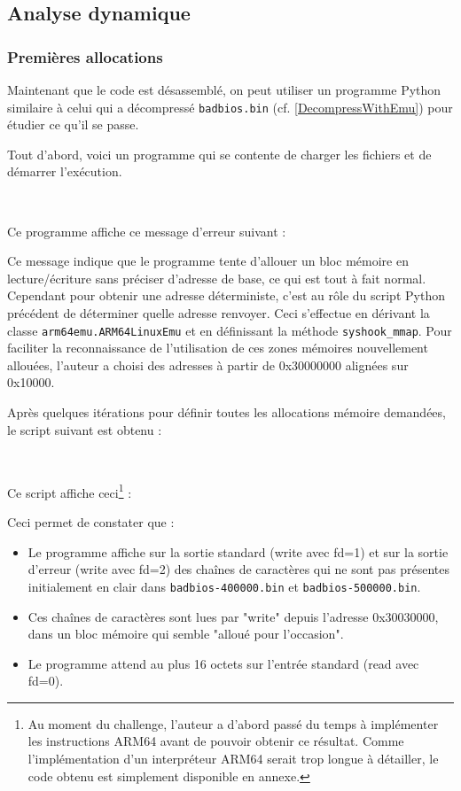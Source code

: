 \documentclass[a4paper,10pt]{article}
\newcommand{\pyinput}[1]{%
    \noindent{\color[rgb]{0.5, 0.5, 0.5}{\rule{\textwidth}{0.4pt}}}
     \\
    \noindent{\color[rgb]{0.5, 0.5, 0.5}{\rule{\textwidth}{0.4pt}}}
}
\begin{document}
\subsection{Analyse dynamique}

\subsubsection{Premières allocations}
\label{arm64mmaps}

Maintenant que le code est désassemblé, on peut utiliser un programme Python similaire à celui qui a décompressé \texttt{badbios.bin} (cf. \ref{DecompressWithEmu}) pour étudier ce qu'il se passe.

Tout d'abord, voici un programme qui se contente de charger les fichiers et de démarrer l'exécution.

\pyinput{2_arm64/run_unpacked_badbios1.py.inc.tex}

Ce programme affiche ce message d'erreur suivant :



Ce message indique que le programme tente d'allouer un bloc mémoire en lecture/écriture sans préciser d'adresse de base, ce qui est tout à fait normal. Cependant pour obtenir une adresse déterministe, c'est au rôle du script Python précédent de déterminer quelle adresse renvoyer. Ceci s'effectue en dérivant la classe \texttt{arm64emu.ARM64LinuxEmu} et en définissant la méthode \texttt{syshook\_mmap}. Pour faciliter la reconnaissance de l'utilisation de ces zones mémoires nouvellement allouées, l'auteur a choisi des adresses à partir de 0x30000000 alignées sur 0x10000.

Après quelques itérations pour définir toutes les allocations mémoire demandées, le script suivant est obtenu :

\pyinput{2_arm64/run_unpacked_badbios2.py.inc.tex}

Ce script affiche ceci\footnote{Au moment du challenge, l'auteur a d'abord passé du temps à implémenter les instructions ARM64 avant de pouvoir obtenir ce résultat. Comme l'implémentation d'un interpréteur ARM64 serait trop longue à détailler, le code obtenu est simplement disponible en annexe.} :



Ceci permet de constater que :
\begin{itemize}
\item Le programme affiche sur la sortie standard (write avec fd=1) et sur la sortie d'erreur (write avec fd=2) des chaînes de caractères qui ne sont pas présentes initialement en clair dans \texttt{badbios-400000.bin} et \texttt{badbios-500000.bin}.
\item Ces chaînes de caractères sont lues par "write" depuis l'adresse 0x30030000, dans un bloc mémoire qui semble "alloué pour l'occasion".
\item Le programme attend au plus 16 octets sur l'entrée standard (read avec fd=0).
\end{itemize}
\end{document}
